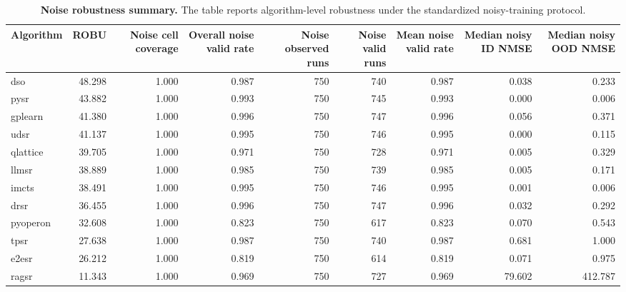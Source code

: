 \begin{table}
\caption{\textbf{Noise robustness summary.} The table reports algorithm-level robustness under the standardized noisy-training protocol.}
\label{tab:table13_noise_robustness_summary}
\begin{tabular}{lrrrrrrrr}
\toprule
\textbf{Algorithm} & \textbf{ROBU} & \textbf{Noise cell coverage} & \textbf{Overall noise valid rate} & \textbf{Noise observed runs} & \textbf{Noise valid runs} & \textbf{Mean noise valid rate} & \textbf{Median noisy ID NMSE} & \textbf{Median noisy OOD NMSE} \\
\midrule
dso & 48.298 & 1.000 & 0.987 & 750 & 740 & 0.987 & 0.038 & 0.233 \\
pysr & 43.882 & 1.000 & 0.993 & 750 & 745 & 0.993 & 0.000 & 0.006 \\
gplearn & 41.380 & 1.000 & 0.996 & 750 & 747 & 0.996 & 0.056 & 0.371 \\
udsr & 41.137 & 1.000 & 0.995 & 750 & 746 & 0.995 & 0.000 & 0.115 \\
qlattice & 39.705 & 1.000 & 0.971 & 750 & 728 & 0.971 & 0.005 & 0.329 \\
llmsr & 38.889 & 1.000 & 0.985 & 750 & 739 & 0.985 & 0.005 & 0.171 \\
imcts & 38.491 & 1.000 & 0.995 & 750 & 746 & 0.995 & 0.001 & 0.006 \\
drsr & 36.455 & 1.000 & 0.996 & 750 & 747 & 0.996 & 0.032 & 0.292 \\
pyoperon & 32.608 & 1.000 & 0.823 & 750 & 617 & 0.823 & 0.070 & 0.543 \\
tpsr & 27.638 & 1.000 & 0.987 & 750 & 740 & 0.987 & 0.681 & 1.000 \\
e2esr & 26.212 & 1.000 & 0.819 & 750 & 614 & 0.819 & 0.071 & 0.975 \\
ragsr & 11.343 & 1.000 & 0.969 & 750 & 727 & 0.969 & 79.602 & 412.787 \\
\bottomrule
\end{tabular}
\end{table}
